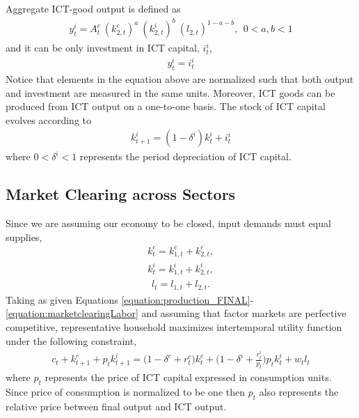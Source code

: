 \documentclass[12pt]{article}
\begin{document}
Aggregate ICT-good output is defined as
\begin{eqnarray}\label{equation:production_ICT_aggregate}
	y^i_t = A^c_t \ ( k^c_{2,t} )^a \ ( k^i_{2,t} )^b \ ( l_{2,t} )^{1-a-b}, \ \ 0 < a,b < 1
\end{eqnarray}
and it can be only investment in ICT capital, $i^i_t$,
\begin{eqnarray}\label{equation:resourceICT}
y^i_t = i^i_t
\end{eqnarray}
Notice that elements in the equation above are normalized such that both output and investment are measured in the same units. Moreover, ICT goods can be produced from ICT output on a one-to-one basis. The stock of ICT capital evolves according to
\begin{eqnarray}\label{equation:LOM_ICT}
k^i_{t+1} = (1 - \delta^i) k^i_t + i^i_t
\end{eqnarray}
where $0 < \delta^i < 1$ represents the period depreciation of ICT capital.

\subsection{Market Clearing across Sectors}

Since we are assuming our economy to be closed, input demands must equal supplies,
\begin{eqnarray}\label{equation:marketclearingHard}
k^c_t = k^c_{1,t} + k^c_{2,t},
\end{eqnarray}
\begin{eqnarray}\label{equation:marketclearingICT}
k^i_t = k^i_{1,t} + k^i_{2,t}, 
\end{eqnarray}
\begin{eqnarray}\label{equation:marketclearingLabor}
l_t = l_{1,t} + l_{2,t}.
\end{eqnarray}
Taking as given Equations \ref{equation:production_FINAL}-\ref{equation:marketclearingLabor} and assuming that factor markets are perfective competitive, representative household maximizes intertemporal utility function under the following constraint,
\begin{eqnarray}\label{equation:resourceHH}
	c_t + k^c_{t+1} +p_t k^i_{t+1} = \bigg( 1 - \delta^c + r^c_t \bigg) k^c_t + \bigg( 1 - \delta^i + \frac{r^i_t}{p_t} \bigg) p_t k^i_t + w_t l_t	
\end{eqnarray}
where $p_t$ represents the price of ICT capital expressed in consumption units. Since price of consumption is normalized to be one then $p_t$ also represents the relative price between final output and ICT output.
\end{document}
